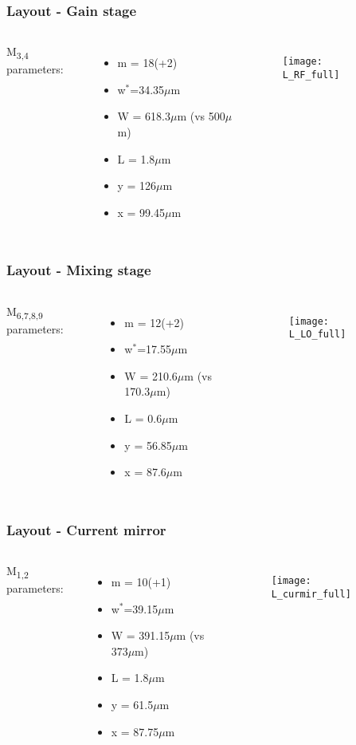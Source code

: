 \begin{frame}
	\frametitle{Layout - Gain stage}
	\begin{columns}
		M\textsubscript{3,4} parameters:
			\begin{itemize}
				\item m = 18(+2)
				\item w$^*$=34.35$\mu$m
				\item W = 618.3$\mu$m (vs 500$\mu$m)
				\item L = 1.8$\mu$m
				\item y = 126$\mu$m
				\item x = 99.45$\mu$m
			\end{itemize}
		\begin{figure}[H]
			\centering
			\texttt{[image: L\_RF\_full]}
			\label{L_RF_full}
		\end{figure}
	\end{columns}
\end{frame}

\begin{frame}
\frametitle{Layout - Mixing stage}
	\begin{columns}
	\column{0.3\textwidth}
	M\textsubscript{6,7,8,9} parameters:
	\begin{itemize}
		\item m = 12(+2)
		\item w$^*$=17.55$\mu$m
		\item W = 210.6$\mu$m (vs 170.3$\mu$m)
		\item L = 0.6$\mu$m
		\item y = 56.85$\mu$m
		\item x = 87.6$\mu$m
	\end{itemize}
	\column{0.7\textwidth}
	\begin{figure}[H]
		\centering
		\texttt{[image: L\_LO\_full]}
		\label{L_LO_full}
	\end{figure}
	\end{columns}
\end{frame}

\begin{frame}
	\frametitle{Layout - Current mirror}
	\begin{columns}
		\column{0.4\textwidth}
		M\textsubscript{1,2} parameters:
		\begin{itemize}
			\item m = 10(+1)
			\item w$^*$=39.15$\mu$m
			\item W = 391.15$\mu$m (vs 373$\mu$m)
			\item L = 1.8$\mu$m
			\item y = 61.5$\mu$m
			\item x = 87.75$\mu$m
		\end{itemize}
		\column{0.6\textwidth}
		\begin{figure}[H]
			\centering
			\texttt{[image: L\_curmir\_full]}
			\label{L_curmir_full}
		\end{figure}
	\end{columns}
\end{frame}


